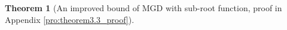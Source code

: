 \documentclass{article}
\def\sR{\mathbb{R}}
\def\vx{{\mathbf{x}}}
\def\eE{\mathbb{E}}
\newtheorem{theorem}{Theorem}
\begin{document}
\begin{theorem}[An improved bound of MGD with sub-root function, proof in Appendix \ref{pro:theorem3.3_proof}] \label{thm: theorem 3.3 sub-root}
    




\end{theorem}
\end{document}
